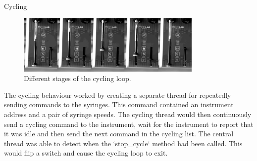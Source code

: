 \documentclass[a0paper,landscape,fontscale=0.32]{baposter}
\begin{document}
\begin{poster}
\begin{posterbox}[name=cycling,column=1,span=2,below=implementation]{Cycling}
\begin{figure}[H]
    \begin{center}
    \includegraphics[width=0.8\textwidth]{images/combined}
    \end{center}
    \vspace{-1.2em}
  \caption{Different stages of the cycling loop.}
\end{figure}
\begin{multicols}{2}
The cycling behaviour worked by creating a separate thread for repeatedly sending commands to the syringes.
    This command contained an instrument address and a pair of syringe speeds. The cycling thread would then
    continuously send a cycling command to the instrument, wait for the instrument to report that it was idle
     and then send the next command in the cycling list.
    The central thread was able to detect when the `stop\_cycle` method had been called. This would flip a
    switch and cause the cycling loop to exit.
\end{multicols}
\end{posterbox}


\end{poster}
\end{document}
